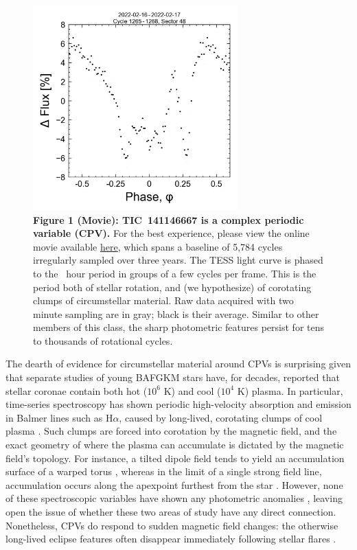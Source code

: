 \documentclass{nature3}
\begin{document}
\begin{figure}[!t]
  \centering
  \includegraphics[width=0.7\textwidth]{figures/f1.png}
  \caption[]{{\bf Figure 1 (Movie):  TIC~141146667 is a complex periodic
  variable (CPV).} For the best experience, please view the online movie
  available
  \href{https://lgbouma.com/movies/movie_TIC1411_flux_phase.mp4}{here},
  which spans a baseline of 5{,}784 cycles irregularly sampled over three
  years.  The TESS light curve is phased to the \periodhr\ hour period in
  groups of a few cycles per frame.  This is the period both of
  stellar rotation, and (we hypothesize) of corotating clumps of
  circumstellar material.  Raw data acquired with two minute
  sampling are in gray; black is their average.  Similar to other members
  of this class, the sharp photometric features persist for tens to
  thousands of rotational cycles. }
  \label{fig:lc}
\end{figure}


The dearth of evidence for circumstellar material around CPVs is
surprising given that separate studies of young BAFGKM stars have, for
decades, reported that stellar coronae contain both hot ($10^6$ K) and
cool ($10^4$ K) plasma. In particular, time-series spectroscopy has
shown periodic high-velocity absorption and emission in Balmer lines
such as H$\alpha$, caused by long-lived, corotating clumps of cool
plasma \cite{CollierCameron1989,Donati2000,Dunstone2006,Skelly2008}.
Such clumps are forced into corotation by the magnetic field, and the
exact geometry of where the plasma can accumulate is dictated by the
magnetic field's topology.  For instance, a tilted dipole field tends
to yield an accumulation surface of a warped torus
\cite{Townsend2005}, whereas in the limit of a single strong field
line, accumulation occurs along the apexpoint furthest from the star
\cite{Waugh2022}.
However, none of these spectroscopic variables have shown any
photometric anomalies \cite{Bouma2024}, leaving open the issue of
whether these two areas of study have any direct connection.
Nonetheless, CPVs do respond to sudden magnetic field changes: the
otherwise long-lived eclipse features often disappear immediately
following stellar flares \cite{Stauffer2017,Bouma2024}.
\end{document}
